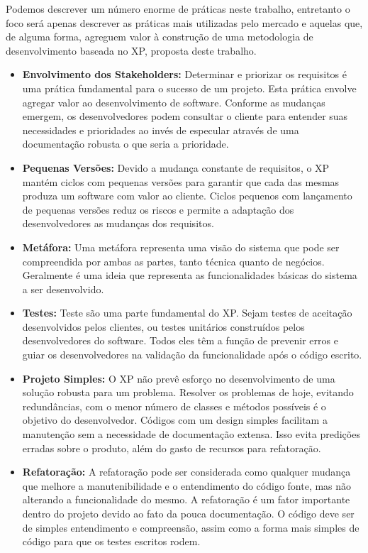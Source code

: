 Podemos descrever um número enorme de práticas  neste trabalho, entretanto o foco será apenas descrever as práticas mais utilizadas pelo mercado e aquelas que, de alguma forma, agreguem valor à construção de uma metodologia de desenvolvimento baseada no XP, proposta deste trabalho.

\begin{itemize}

	\item \textbf{Envolvimento dos Stakeholders:} Determinar e priorizar os requisitos é uma prática fundamental para o sucesso de um projeto.  Esta prática envolve agregar valor ao desenvolvimento de software. Conforme as mudanças emergem, os desenvolvedores podem consultar o cliente para entender suas necessidades e prioridades ao invés de especular através de uma documentação robusta o que seria a prioridade.

	\item \textbf{Pequenas Versões:} Devido a mudança constante de requisitos, o XP mantém ciclos com pequenas versões para garantir que cada das mesmas produza um software com valor ao cliente. Ciclos pequenos com lançamento de pequenas versões reduz os riscos e permite a adaptação dos desenvolvedores as mudanças dos requisitos.

	\item \textbf{Metáfora:} Uma metáfora representa uma visão do sistema que pode ser compreendida por ambas as partes, tanto técnica quanto de negócios. Geralmente é uma ideia que representa as funcionalidades básicas do sistema a ser desenvolvido.

	\item \textbf{Testes:} Teste são uma parte fundamental do XP. Sejam testes de aceitação desenvolvidos pelos clientes, ou testes unitários construídos pelos desenvolvedores do software. Todos eles têm a função de prevenir erros e guiar os desenvolvedores  na validação da funcionalidade após o código escrito.

	\item \textbf{Projeto Simples:} O XP não prevê esforço no desenvolvimento de uma solução robusta para um problema. Resolver os problemas de hoje, evitando redundâncias, com o menor número de classes e métodos possíveis é o objetivo do desenvolvedor. Códigos com um design simples facilitam a manutenção sem a necessidade de documentação extensa. Isso evita predições erradas sobre o produto, além do gasto de recursos para refatoração.

	\item \textbf{Refatoração:} A refatoração pode ser considerada como qualquer mudança que melhore a manutenibilidade e o entendimento do código fonte, mas não alterando a funcionalidade do mesmo. \cite{Fowler:1999} A refatoração é um fator importante dentro do projeto devido ao fato da pouca documentação. O código deve ser de simples entendimento e compreensão, assim como a forma mais simples de código para que os testes escritos rodem.


\end{itemize}
